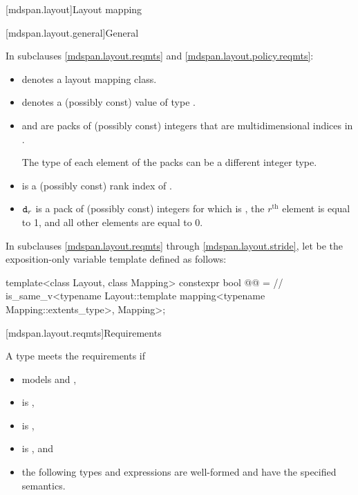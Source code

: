 [mdspan.layout]{Layout mapping}

[mdspan.layout.general]{General}

\pnum
In subclauses \ref{mdspan.layout.reqmts} and \ref{mdspan.layout.policy.reqmts}:

\begin{itemize}
\item
{} denotes a layout mapping class.

\item
{} denotes a (possibly const) value of type .

\item
{} and  are packs of (possibly const) integers
that are multidimensional indices in .
\begin{note}
The type of each element of the packs can be a different integer type.
\end{note}

\item
{} is a (possibly const) rank index of .

\item
$\tcode{d}_r$ is a pack of (possibly const) integers
for which  is ,
the $r^\text{th}$ element is equal to 1, and
all other elements are equal to 0.
\end{itemize}

\pnum
In subclauses \ref{mdspan.layout.reqmts} through \ref{mdspan.layout.stride},
let  be the exposition-only variable template defined as follows:
\begin{codeblock}
template<class Layout, class Mapping>
constexpr bool @@ =  // \expos
  is_same_v<typename Layout::template mapping<typename Mapping::extents_type>, Mapping>;
\end{codeblock}

[mdspan.layout.reqmts]{Requirements}

\pnum
A type  meets the  requirements if

\begin{itemize}
\item
{} models  and ,
\item
{} is ,
\item
{} is ,
\item
{} is , and
\item
the following types and expressions are well-formed and
have the specified semantics.
\end{itemize}

